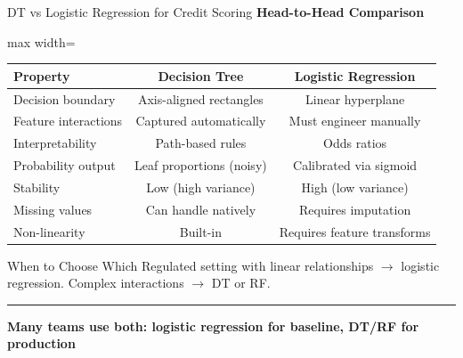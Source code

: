 \documentclass[8pt,aspectratio=169]{beamer}
\newcommand{\bottomnote}[1]{%
\vfill
\vspace{-2mm}
\textcolor{mllavender2}{\rule{\textwidth}{0.4pt}}
\vspace{1mm}
\footnotesize
\textbf{#1}
}
\begin{document}
\begin{frame}[t]{DT vs Logistic Regression for Credit Scoring}
\small
\textbf{Head-to-Head Comparison}

\vspace{2mm}
\footnotesize
\begin{adjustbox}{max width=\textwidth}
\begin{tabular}{lcc}
\toprule
\textbf{Property} & \textbf{Decision Tree} & \textbf{Logistic Regression} \\
\midrule
Decision boundary & Axis-aligned rectangles & Linear hyperplane \\
\rowcolor{mllavender4}
Feature interactions & Captured automatically & Must engineer manually \\
Interpretability & Path-based rules & Odds ratios \\
\rowcolor{mllavender4}
Probability output & Leaf proportions (noisy) & Calibrated via sigmoid \\
Stability & Low (high variance) & High (low variance) \\
\rowcolor{mllavender4}
Missing values & Can handle natively & Requires imputation \\
Non-linearity & Built-in & Requires feature transforms \\
\bottomrule
\end{tabular}
\end{adjustbox}

\vspace{2mm}
\begin{block}{When to Choose Which}
\footnotesize Regulated setting with linear relationships $\to$ logistic regression. Complex interactions $\to$ DT or RF.
\end{block}
\bottomnote{Many teams use both: logistic regression for baseline, DT/RF for production}
\end{frame}
\end{document}
